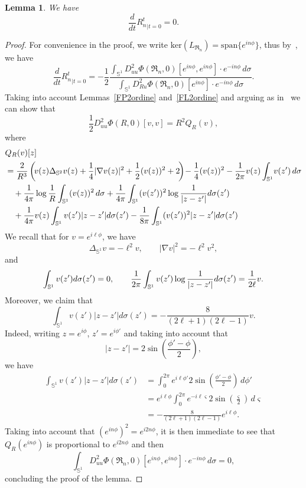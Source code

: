 \documentclass[10pt,reqno,english]{amsart}
\newcommand{\Sd}{\mathbb{S}^2}
\newcommand{\Su}{\mathbb{S}^1}
\newcommand{\rn}{{\mathfrak R}_n  }
\newtheorem{lemma}{Lemma}[section]
\theoremstyle{definition}
\numberwithin{equation}{section}
\begin{document}
 
\begin{lemma}
\label{lemma:derRag2D}
We have
\[
\frac{d}{dt}{R_n^t}_{|t=0}=0.
\]
\end{lemma}
\begin{proof}
For convenience in the proof, we write $\mathrm{ker}( L_{\rn})=\mathrm{span}\{e^{in\phi}\}$, thus by~\cite[formula (I.6.3)]{KieBook}, we have
\[
\frac{d}{dt}{R_n^t}_{|t=0}=-\frac12\frac{\int_{\Su} D^2_{uu}\Phi(\rn,0)[e^{in\phi},e^{in\phi}]\cdot e^{-in\phi}\,d\sigma}{\int_{\Su} D^2_{Ru}\Phi(\rn,0)[e^{in\phi}]\cdot e^{-in\phi}\,d\sigma}.
\]
Taking into account Lemmas~\ref{FP2ordine} and~\ref{FL2ordine} and arguing as in~\cite[Proposition 10]{Fr19} we can show that
\[
\frac12 D^2_{uu}\Phi(R,0)[v,v]=R^2 Q_R(v),
\]
where
\begin{align*}
&Q_R(v)[z]\\
&=\frac{2}{R^3}\left(\!v(z)\Delta_{\Sd}v(z)+\frac{1}{4}|\nabla v(z)|^2+\frac{1}{2}(v(z))^2+2\!\right)\!-\frac{1}{4}(v(z))^2-\frac{1}{2\pi} v(z) \int_{\mathbb{S}^1}\! v(z')\,d\sigma\\
&\quad+\frac{1}{4\pi} \log {1\over R}\int_{\mathbb{S}^1} (v(z))^2\,d\sigma+\frac{1}{4\pi}\int_{\mathbb{S}^1} (v(z'))^2 \log {1\over |z-z'|} d\sigma (z')\\
&\quad+\frac{1}{4\pi}v(z)\int_{\mathbb{S}^1} v(z')|z-z'| d\sigma (z')-\frac{1}{8\pi}\int_{\mathbb{S}^1} (v(z'))^2|z-z'| d\sigma (z')
\end{align*}
We recall that for $v=e^{i\ell\phi}$, we have
\[
\Delta_{\Su}v=-\ell^2v,\qquad |\nabla v|^2=-\ell^2 v^2,
\]
and
\[
\int_{\mathbb{S}^1} v (z') d\sigma (z')=0,\qquad{1\over 2\pi}  \int_{\mathbb{S}^1} v (z') \log {1\over |z-z'|} d\sigma (z') ={1\over 2\ell} v.
\]
Moreover, we claim that
\[
\int_{\mathbb{S}^1} v(z')|z-z'| d\sigma (z')=-\frac{8}{(2\ell+1)(2\ell-1)}v.
\]
Indeed, writing $z=e^{i\phi}$, $z'=e^{i\phi'}$ and taking into account that 
\[
|z-z'|=2\sin\left(\frac{\phi'-\phi}{2}\right),
\]
we have
\begin{align*}
\int_{\mathbb{S}^1} v(z')|z-z'| d\sigma (z')&=\int_0^{2\pi}e^{i\ell\phi'} 2\sin\left(\frac{\phi'-\phi}{2}\right)\,d\phi'\\
&=e^{i\ell\phi}\int_0^{2\pi}e^{-i\ell\varsigma} 2\sin\left(\frac{\varsigma}{2}\right)\,d\varsigma\\
&=-\frac{8}{(2\ell+1)(2\ell-1)}e^{i\ell\phi}.
\end{align*}
Taking into account that $(e^{in\phi})^2=e^{i2n\phi}$, it is then immediate to see that $Q_R(e^{in\phi})$ is proportional to $e^{i2n\phi}$ and then
\[
\int_{\Su} D^2_{uu}\Phi(\rn,0)[e^{in\phi},e^{in\phi}]\cdot e^{-in\phi}\,d\sigma=0,
\]
concluding the proof of the lemma.
\end{proof}
\end{document}
